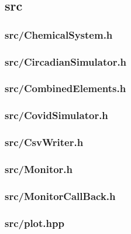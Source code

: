 
\newpage
\subsection{src}
\subsubsection{src/ChemicalSystem.h}

\newpage
\subsubsection{src/CircadianSimulator.h}

\newpage
\subsubsection{src/CombinedElements.h}

\newpage
\subsubsection{src/CovidSimulator.h}

\newpage
\subsubsection{src/CsvWriter.h}

\newpage
\subsubsection{src/Monitor.h}

\newpage
\subsubsection{src/MonitorCallBack.h}

\newpage
\subsubsection{src/plot.hpp}

\newpage
